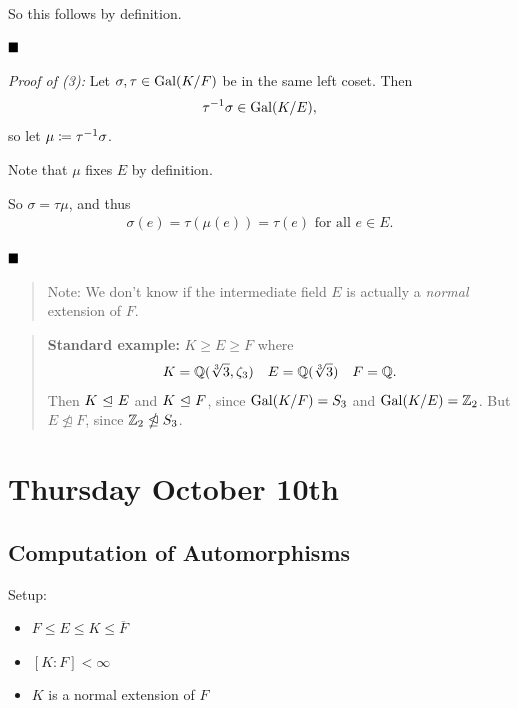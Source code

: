 So this follows by definition.

\(\qed\)

\emph{Proof of (3):} Let \(\sigma, \tau \in \mathrm{Gal}(K/F)\) be in the same
left coset. Then
\begin{align*}
\tau^{-1}\sigma \in \mathrm{Gal}(K/E)
,\end{align*} so let \(\mu \coloneqq \tau^{-1}\sigma\).

Note that \(\mu\) fixes \(E\) by definition.

So \(\sigma = \tau \mu\), and thus
\begin{align*}
\sigma(e) = \tau(\mu(e)) = \tau(e) \text{ for all } e\in E
.\end{align*}

\(\qed\)

\begin{quote}
Note: We don't know if the intermediate field \(E\) is actually a
\emph{normal} extension of \(F\).
\end{quote}

\begin{quote}
\textbf{Standard example:} \(K \geq E \geq F\) where
\begin{align*}
K = {\mathbb{Q}}(\sqrt[3] 3, \zeta_3)\quad E = {\mathbb{Q}}(\sqrt[3] 3) \quad F = {\mathbb{Q}}
.\end{align*} Then \(K {~\trianglelefteq~} E\) and \(K{~\trianglelefteq~} F\), since
\(\mathrm{Gal}(K/F) = S_3\) and \(\mathrm{Gal}(K/E) = {\mathbb{Z}}_2\). But
\(E \ntrianglelefteq F\), since \({\mathbb{Z}}_2 \ntrianglelefteq S_3\).
\end{quote}

\hypertarget{thursday-october-10th}{%
\section{Thursday October 10th}\label{thursday-october-10th}}

\hypertarget{computation-of-automorphisms}{%
\subsection{Computation of
Automorphisms}\label{computation-of-automorphisms}}

Setup:

\begin{itemize}
\item
  \(F \leq E \leq K \leq \overline F\)
\item
  \([K: F] < \infty\)
\item
  \(K\) is a normal extension of \(F\)
\end{itemize}

